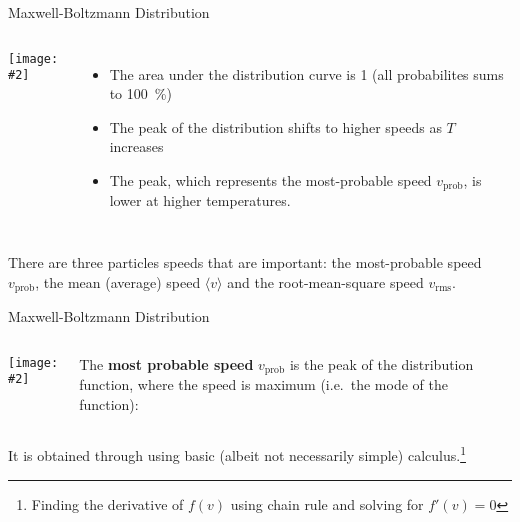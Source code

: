 \documentclass[12pt,aspectratio=169]{beamer}
\newcommand{\pic}[2]{
  \begin{center}
    \texttt{[image: \#2]}
  \end{center}
}
\newcommand{\eq}[2]{
  \vspace{#1}{\Large
    \begin{displaymath}
      #2
    \end{displaymath}
  }
}
\begin{document}
\begin{frame}{Maxwell-Boltzmann Distribution}
  \vspace{.15in}\begin{columns}
    \pic{1.05}{maxwell-boltzmann}
    
    \begin{itemize}
    \item The area under the distribution curve is 1 (all probabilites sums to
      \SI{100}{\percent})
    \item The peak of the distribution shifts to higher speeds as $T$ increases
    \item The peak, which represents the most-probable speed $v_\text{prob}$,
      is lower at higher temperatures.
    \end{itemize}
  \end{columns}
  \vspace{.2in}There are three particles speeds that are important: the
  most-probable speed $v_\text{prob}$, the mean (average) speed
  $\langle v \rangle$ and the root-mean-square speed $v_\text{rms}$.
\end{frame}



\begin{frame}{Maxwell-Boltzmann Distribution}
  \vspace{.15in}\begin{columns}
    \pic{1}{speed-distribution}
    
    The \textbf{most probable speed} $v_\text{prob}$ is the peak of the
    distribution function, where the speed is maximum (i.e.\ the mode of the
    function):

      \eq{-.2in}{
        v_\text{prob}=\sqrt{\frac{2k_BT}m}
      }
  \end{columns}
  \vspace{.2in}It is obtained through using basic (albeit not necessarily
  simple) calculus.\footnote{Finding the derivative of $f(v)$ using chain rule
    and solving for $f'(v)=0$}
  \vspace{.3in}
\end{frame}
\end{document}
